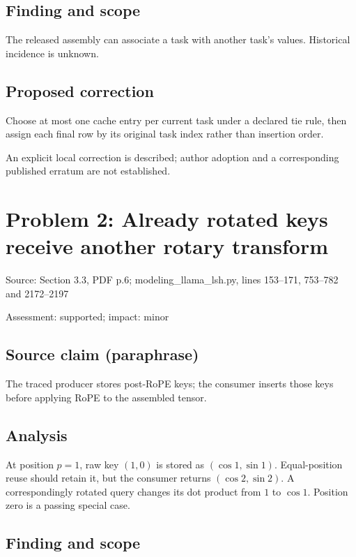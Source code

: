 \documentclass[11pt]{article}
\begin{document}
\subsection*{Finding and scope}

The released assembly can associate a task with another task’s values. Historical incidence is unknown.

\subsection*{Proposed correction}

Choose at most one cache entry per current task under a declared tie rule, then assign each final row by its original task index rather than insertion order.

An explicit local correction is described; author adoption and a corresponding published erratum are not established.

\section*{Problem 2: Already rotated keys receive another rotary transform}

Source: Section 3.3, PDF p.6; modeling\_llama\_lsh.py, lines 153–171, 753–782 and 2172–2197

Assessment: supported; impact: minor

\subsection*{Source claim (paraphrase)}

The traced producer stores post-RoPE keys; the consumer inserts those keys before applying RoPE to the assembled tensor.

\subsection*{Analysis}

At position \(p=1\), raw key \((1,0)\) is stored as \((\cos1,\sin1)\). Equal-position reuse should retain it, but the consumer returns \((\cos2,\sin2)\). A correspondingly rotated query changes its dot product from \(1\) to \(\cos1\). Position zero is a passing special case.

\subsection*{Finding and scope}
\end{document}
